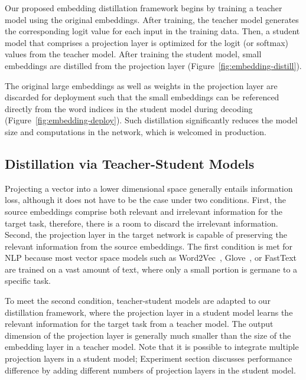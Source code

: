 \documentclass{article}
\begin{document}
Our proposed embedding distillation framework begins by training a teacher model using the original embeddings.
After training, the teacher model generates the corresponding logit value for each input in the training data.
Then, a student model that comprises a projection layer is optimized for the logit (or softmax) values from the teacher model.
After training the student model, small embeddings are distilled from the projection layer (Figure~\ref{fig:embedding-distill}).

\noindent The original large embeddings as well as weights in the projection layer are discarded for deployment such that the small embeddings can be referenced directly from the word indices in the student model during decoding (Figure~\ref{fig:embedding-deploy}).
Such distillation significantly reduces the model size and computations in the network, which is welcomed in production.






\subsection{Distillation via Teacher-Student Models}
\label{ssec:distillation}

\noindent Projecting a vector into a lower dimensional space generally entails information loss, although it does not have to be the case under two conditions.
First, the source embeddings comprise both relevant and irrelevant information for the target task, therefore, there is a room to discard the irrelevant information.
Second, the projection layer in the target network is capable of preserving the relevant information from the source embeddings.
The first condition is met for NLP because most vector space models such as Word2Vec~\cite{mikolov2013distributed}, Glove~\cite{pennington-socher-manning:2014:EMNLP2014}, or FastText~\cite{Q17-1010} are trained on a vast amount of text, where only a small portion is germane to a specific task.

To meet the second condition, teacher-student models are adapted to our distillation framework, where the projection layer in a student model learns the relevant information for the target task from a teacher model.
The output dimension of the projection layer is generally much smaller than the size of the embedding layer in a teacher model.
Note that it is possible to integrate multiple projection layers in a student model; Experiment section discusses performance difference by adding different numbers of projection layers in the student model.
\end{document}
